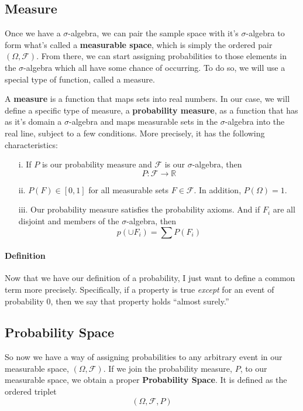 \documentclass[a4paper,12pt]{article}
\theoremstyle{plain}
\theoremstyle{definition}
\theoremstyle{remark}
\begin{document}
\subsection{Measure}

Once we have a $\sigma$-algebra, we can pair the sample space with it's
$\sigma$-algebra to form what's called a
\textbf{measurable space}, which is simply the ordered pair
$(\Omega, \mathcal{F})$.  From there, we can start assigning
probabilities to those elements in the $\sigma$-algebra which all have
some chance of occurring.  To do so, we will use a special
type of function, called a measure.

A \textbf{measure} is a function that maps sets into real numbers.
In our case, we will define a specific type of measure, a
\textbf{probability measure}, as a
function that has as it's domain a $\sigma$-algebra and maps measurable
sets in the $\sigma$-algebra into the
real line, subject to a few conditions. More precisely, it has the
following characteristics:
\begin{itemize}
   \item[i.] If $P$ is our probability measure and $\mathcal{F}$ is
      our $\sigma$-algebra, then
	 \[ P: \mathcal{F} \rightarrow \mathbb{R} \]
   \item[ii.] $ P(F) \in [0,1]$ for all measurable sets
      $F \in \mathcal{F}$. In addition, $P(\Omega) =1$.
   \item[iii.] Our probability measure satisfies the probability axioms.
      And if $F_i$ are all disjoint and members of the $\sigma$-algebra,
      then
	 \[ p( \cup F_i) = \sum P(F_i) \]
\end{itemize}

\paragraph{Definition} Now that we have our definition of a probability,
I just want to define a common term more precisely.  Specifically,
if a property is true \emph{except} for an event of probability 0,
then we say that property holds ``almost surely.''

\subsection{Probability Space}

So now we have a way of assigning probabilities to any arbitrary event in our measurable space, $(\Omega, \mathcal{F})$. If we
join the probability measure, $P$, to our measurable space, we obtain a proper \textbf{Probability Space}.  It is defined as
the ordered triplet
\[(\Omega, \mathcal{F}, P) \]
\end{document}

